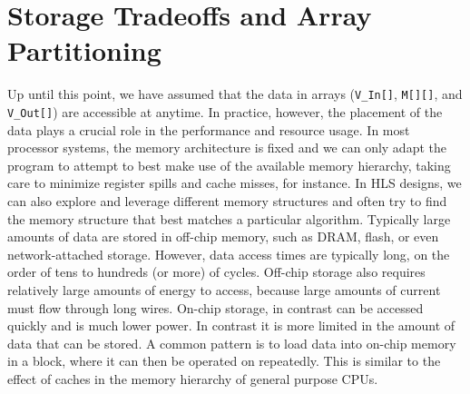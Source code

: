 
%

\section{Storage Tradeoffs and Array Partitioning}
\label{subsec:dft_array_partitioning}

Up until this point, we have assumed that the data in arrays (\lstinline|V_In[]|, \lstinline|M[][]|, and \lstinline|V_Out[]|) are accessible at anytime.  In practice, however, the placement of the data plays a crucial role in the performance and resource usage. In most processor systems, the memory architecture is fixed and we can only adapt the program to attempt to best make use of the available memory hierarchy, taking care to minimize register spills and cache misses, for instance.  In HLS designs, we can also explore and leverage different memory structures and often try to find the memory structure that best matches a particular algorithm.  Typically large amounts of data are stored in off-chip memory, such as DRAM, flash, or even network-attached storage. However, data access times are typically long, on the order of tens to hundreds (or more) of cycles. Off-chip storage also requires relatively large amounts of energy to access, because large amounts of current must flow through long wires.  On-chip storage, in contrast can be accessed quickly and is much lower power.  In contrast it is more limited in the amount of data that can be stored.  A common pattern is to load data into on-chip memory in a block, where it can then be operated on repeatedly.  This is similar to the effect of caches in the memory hierarchy of general purpose CPUs.

